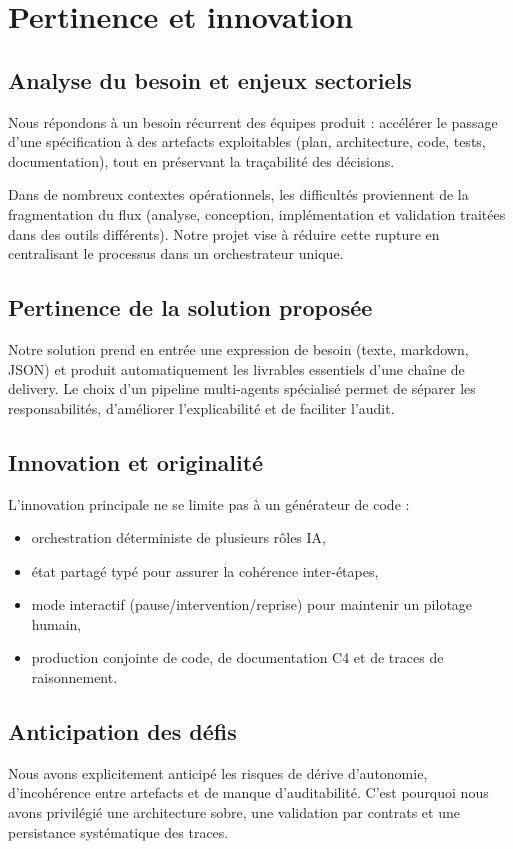 \documentclass[11pt,a4paper]{article}
\begin{document}
\section{Pertinence et innovation}
\subsection*{Analyse du besoin et enjeux sectoriels}
Nous répondons à un besoin récurrent des équipes produit : accélérer le passage d'une spécification à des artefacts exploitables (plan, architecture, code, tests, documentation), tout en préservant la traçabilité des décisions.

Dans de nombreux contextes opérationnels, les difficultés proviennent de la fragmentation du flux (analyse, conception, implémentation et validation traitées dans des outils différents). Notre projet vise à réduire cette rupture en centralisant le processus dans un orchestrateur unique.

\subsection*{Pertinence de la solution proposée}
Notre solution prend en entrée une expression de besoin (texte, markdown, JSON) et produit automatiquement les livrables essentiels d'une chaîne de delivery. Le choix d'un pipeline multi-agents spécialisé permet de séparer les responsabilités, d'améliorer l'explicabilité et de faciliter l'audit.

\subsection*{Innovation et originalité}
L'innovation principale ne se limite pas à un générateur de code :
\begin{itemize}
  \item orchestration déterministe de plusieurs rôles IA,
  \item état partagé typé pour assurer la cohérence inter-étapes,
  \item mode interactif (pause/intervention/reprise) pour maintenir un pilotage humain,
  \item production conjointe de code, de documentation C4 et de traces de raisonnement.
\end{itemize}

\subsection*{Anticipation des défis}
Nous avons explicitement anticipé les risques de dérive d'autonomie, d'incohérence entre artefacts et de manque d'auditabilité. C'est pourquoi nous avons privilégié une architecture sobre, une validation par contrats et une persistance systématique des traces.
\end{document}
